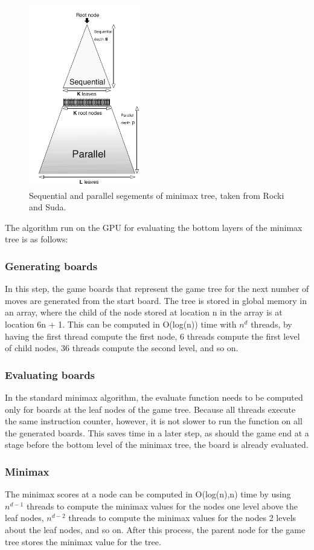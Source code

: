 \documentclass{article}
\begin{document}
\begin{figure}[ht!]
\centering
\includegraphics[width=50mm]{minimax-diagram.png}
\caption{Sequential and parallel segements of minimax tree, taken from Rocki and Suda\cite{rockisuda10}.}
\label{fig:minimaxdiagram}
\end{figure}

The algorithm run on the GPU for evaluating the bottom layers of the minimax tree is as follows:

\subsubsection{Generating boards}
In this step, the game boards that represent the game tree for the next number of moves are generated from the start board. The tree is stored in global memory in an array, where the child of the node stored at location n in the array is at location 6n + 1. This can be computed in O(log(n)) time with $n^{d}$ threads, by having the first thread compute the first node, 6 threads compute the first level of child nodes, 36 threads compute the second level, and so on.

\subsubsection{Evaluating boards}
In the standard minimax algorithm, the evaluate function needs to be computed only for boards at the leaf nodes of the game tree. Because all threads execute the same instruction counter, however, it is not slower to run the function on all the generated boards. This saves time in a later step, as should the game end at a stage before the bottom level of the minimax tree, the board is already evaluated.

\subsubsection{Minimax}
The minimax scores at a node can be computed in O(log(n),n) time by using $n^{d-1}$ threads to compute the minimax values for the nodes one level above the leaf nodes, $n^{d-2}$ threads to compute the minimax values for the nodes 2 levels about the leaf nodes, and so on. After this process, the parent node for the game tree stores the minimax value for the tree.
\end{document}
